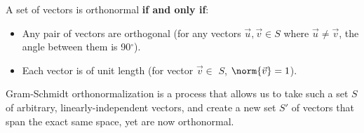 \pgfplotsset{width=7cm,compat=1.16}

% 


A set of vectors is orthonormal \textbf{if and only if}:
\begin{itemize}
    \item Any pair of vectors are orthogonal (for any vectors $\vec{u}, \vec{v} \in S$ where $\vec{u} \neq \vec{v}$, the angle between them is 90$^\circ$).
    \item Each vector is of unit length (for vector $\vec{v} \in $ $S$, $\norm{\vec{v}} = 1$).
\end{itemize}

Gram-Schmidt orthonormalization is a process that allows us to take such a set $S$ of arbitrary, linearly-independent vectors, and create a new set $S'$ of vectors that span the exact same space, yet are now orthonormal.

